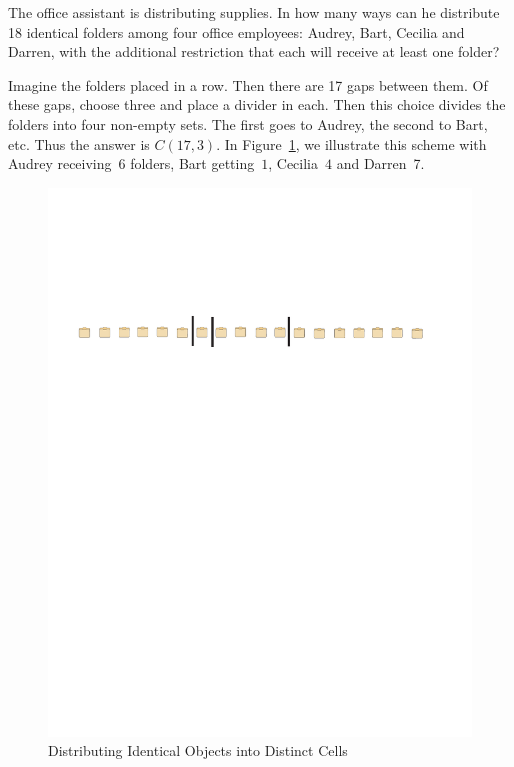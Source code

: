 \begin{example} 
  The office assistant is distributing supplies.  In how many ways can
  he distribute 18 identical folders among four office employees:
  Audrey, Bart, Cecilia and Darren, with the additional restriction that
  each will receive at least one folder?

  Imagine the folders placed in a row.  Then there are 17 gaps between
  them.  Of these gaps, choose three and place a divider in each.
  Then this choice divides the folders into four non-empty sets.  The
  first goes to Audrey, the second to Bart, etc.  Thus the answer is
  $C(17,3)$.  In Figure~\ref{fig:distrib}, we illustrate this scheme
  with Audrey receiving~$6$ folders, Bart getting~$1$, Cecilia~$4$ and
  Darren~7.

\begin{figure}
\begin{center}
\includegraphics[viewport=36 562 544 612,scale=.6]{string-figs/3012-fig23}
\caption{{Distributing Identical Objects into Distinct
    Cells}}
\label{fig:distrib}
\end{center}
\end{figure}
\end{example}

